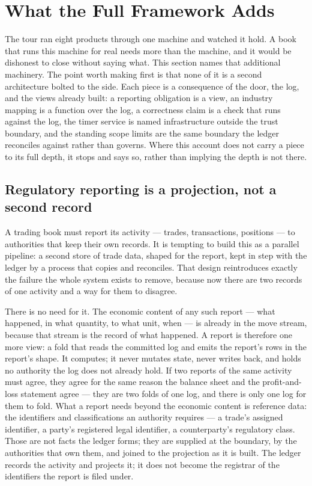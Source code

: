 \section{What the Full Framework Adds}\label{sec:framework}

The tour ran eight products through one machine and watched it hold. A book that
runs this machine for real needs more than the machine, and it would be dishonest
to close without saying what. This section names that additional machinery. The
point worth making first is that none of it is a second architecture bolted to the
side. Each piece is a consequence of the door, the log, and the views already
built: a reporting obligation is a view, an industry mapping is a function over the
log, a correctness claim is a check that runs against the log, the timer service is
named infrastructure outside the trust boundary, and the standing scope limits are
the same boundary the ledger reconciles against rather than governs. Where this
account does not carry a piece to its full depth, it stops and says so, rather than
implying the depth is not there.

\subsection{Regulatory reporting is a projection, not a second record}

A trading book must report its activity --- trades, transactions, positions ---
to authorities that keep their own records. It is tempting to build this as a
parallel pipeline: a second store of trade data, shaped for the report, kept in
step with the ledger by a process that copies and reconciles. That design
reintroduces exactly the failure the whole system exists to remove, because now
there are two records of one activity and a way for them to disagree.

There is no need for it. The economic content of any such report --- what happened,
in what quantity, to what unit, when --- is already in the move stream, because
that stream is the record of what happened. A report is therefore one more view:
a fold that reads the committed log and emits the report's rows in the report's
shape. It computes; it never mutates state, never writes back, and holds no
authority the log does not already hold. If two reports of the same activity must
agree, they agree for the same reason the balance sheet and the profit-and-loss
statement agree --- they are two folds of one log, and there is only one log for
them to fold. What a report needs beyond the economic content is reference data:
the identifiers and classifications an authority requires --- a trade's assigned
identifier, a party's registered legal identifier, a counterparty's regulatory
class. Those are not facts the ledger forms; they are supplied at the boundary, by
the authorities that own them, and joined to the projection as it is built. The
ledger records the activity and projects it; it does not become the registrar of
the identifiers the report is filed under.

